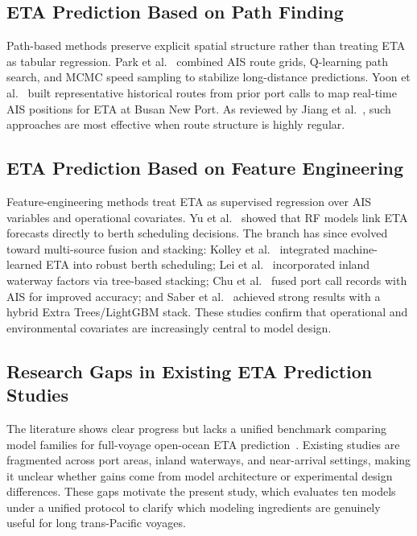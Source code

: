\documentclass[sigconf,anonymous]{acmart}%
\begin{document}
\subsection{ETA Prediction Based on Path Finding}
Path-based methods preserve explicit spatial structure rather than treating ETA as tabular regression. Park et al.~\cite{parkVesselEstimatedTime2021} combined AIS route grids, Q-learning path search, and MCMC speed sampling to stabilize long-distance predictions. Yoon et al.~\cite{yoonEnhancingContainerVessel2023} built representative historical routes from prior port calls to map real-time AIS positions for ETA at Busan New Port. As reviewed by Jiang et al.~\cite{jiangPredictionVesselArrival2025}, such approaches are most effective when route structure is highly regular.

\subsection{ETA Prediction Based on Feature Engineering}
Feature-engineering methods treat ETA as supervised regression over AIS variables and operational covariates. Yu et al.~\cite{yuShipArrivalPrediction2018} showed that RF models link ETA forecasts directly to berth scheduling decisions. The branch has since evolved toward multi-source fusion and stacking: Kolley et al.~\cite{kolleyRobustBerthScheduling2022} integrated machine-learned ETA into robust berth scheduling; Lei et al.~\cite{leiPredictingVesselArrival2024} incorporated inland waterway factors via tree-based stacking; Chu et al.~\cite{chuVesselArrivalTime2025} fused port call records with AIS for improved accuracy; and Saber et al.~\cite{saberHighaccuracyPredictionVessels2025} achieved strong results with a hybrid Extra Trees/LightGBM stack. These studies confirm that operational and environmental covariates are increasingly central to model design.

\subsection{Research Gaps in Existing ETA Prediction Studies}
The literature shows clear progress but lacks a unified benchmark comparing model families for full-voyage open-ocean ETA prediction~\cite{jiangPredictionVesselArrival2025,nomanReviewVesselTime2025}. Existing studies are fragmented across port areas, inland waterways, and near-arrival settings, making it unclear whether gains come from model architecture or experimental design differences. These gaps motivate the present study, which evaluates ten models under a unified protocol to clarify which modeling ingredients are genuinely useful for long trans-Pacific voyages.
\end{document}

